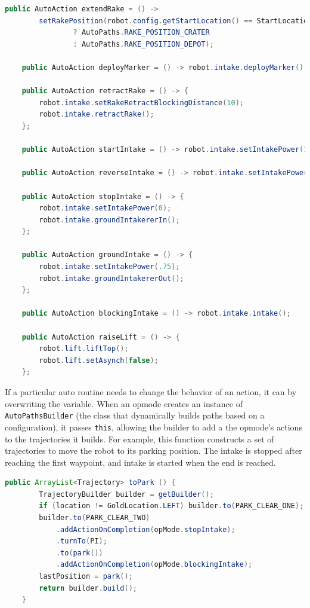 \documentclass{article}
\begin{document}
\begin{lstlisting}[language=Java] 
    public AutoAction extendRake = () ->
        setRakePosition(robot.config.getStartLocation() == StartLocation.CRATER
                ? AutoPaths.RAKE_POSITION_CRATER
                : AutoPaths.RAKE_POSITION_DEPOT);

    public AutoAction deployMarker = () -> robot.intake.deployMarker();

    public AutoAction retractRake = () -> {
        robot.intake.setRakeRetractBlockingDistance(10);
        robot.intake.retractRake();
    };

    public AutoAction startIntake = () -> robot.intake.setIntakePower(1);

    public AutoAction reverseIntake = () -> robot.intake.setIntakePower(-1);

    public AutoAction stopIntake = () -> {
        robot.intake.setIntakePower(0);
        robot.intake.groundIntakererIn();
    };

    public AutoAction groundIntake = () -> {
        robot.intake.setIntakePower(.75);
        robot.intake.groundIntakererOut();
    };

    public AutoAction blockingIntake = () -> robot.intake.intake();

    public AutoAction raiseLift = () -> {
        robot.lift.liftTop();
        robot.lift.setAsynch(false);
    };

\end{lstlisting}

If a particular auto routine needs to change the behavior of an action, it can by overwriting the variable. When an opmode creates an instance of \texttt{AutoPathsBuilder} (the class that dynamically builds paths based on a configuration), it passes \texttt{this}, allowing the builder to add a the opmode's actions to the trajectories it builds. For example, this function constructs a set of trajectories to move the robot to its parking position. The intake is stopped after reaching the first waypoint, and intake is started when the end is reached. 

\begin{lstlisting}[language=Java] 
     public ArrayList<Trajectory> toPark () {
        TrajectoryBuilder builder = getBuilder();
        if (location != GoldLocation.LEFT) builder.to(PARK_CLEAR_ONE);
        builder.to(PARK_CLEAR_TWO)
            .addActionOnCompletion(opMode.stopIntake);
            .turnTo(PI);
            .to(park())
            .addActionOnCompletion(opMode.blockingIntake);
        lastPosition = park();
        return builder.build();
    }

\end{lstlisting}
\end{document}
